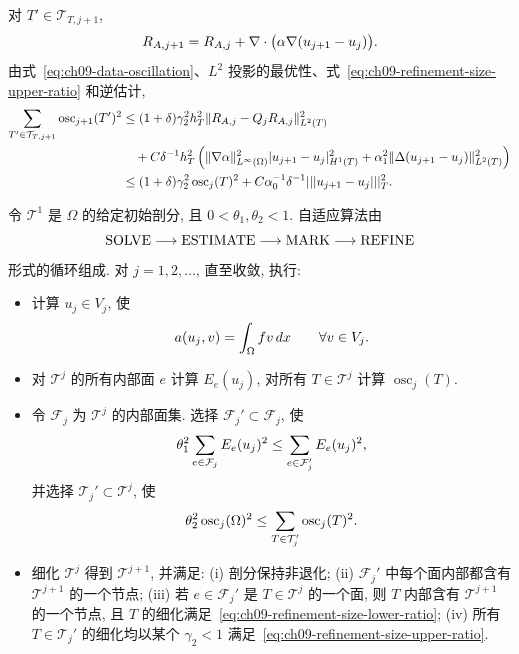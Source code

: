 \begin{Proof}
对 $T'\in\mathcal T_{T,j+1}$,
\[
\MathBookFormulaID{formula-ch09-consecutive-element-residuals}
R_{A,j+1}=R_{A,j}+\nabla\cdot\bigl(\alpha\nabla(u_{j+1}-u_j)\bigr).
\]
由式~\eqref{eq:ch09-data-oscillation}、$L^2$ 投影的最优性、式~\eqref{eq:ch09-refinement-size-upper-ratio} 和逆估计,
\begin{align*}
\MathBookFormulaID{formula-ch09-oscillation-reduction-proof}
\sum_{T'\in\mathcal T_{T,j+1}}\operatorname{osc}_{j+1}(T')^2
&\leq(1+\delta)\gamma_2^2h_T^2\|R_{A,j}-Q_jR_{A,j}\|_{L^2(T)}^2\\
&\quad+C\delta^{-1}h_T^2\left(
\|\nabla\alpha\|_{L^\infty(\Omega)}^2|u_{j+1}-u_j|_{H^1(T)}^2
+\alpha_1^2\|\Delta(u_{j+1}-u_j)\|_{L^2(T)}^2\right)\\
&\leq(1+\delta)\gamma_2^2\operatorname{osc}_j(T)^2
+C\alpha_0^{-1}\delta^{-1}|||u_{j+1}-u_j|||_T^2.
\end{align*}
\end{Proof}

令 $\mathcal T^1$ 是 $\Omega$ 的给定初始剖分, 且 $0<\theta_1,\theta_2<1$. 自适应算法由
\[
\MathBookFormulaID{formula-ch09-adaptive-loop}
\mathrm{SOLVE}\longrightarrow\mathrm{ESTIMATE}\longrightarrow
\mathrm{MARK}\longrightarrow\mathrm{REFINE}
\]
形式的循环组成. 对 $j=1,2,\ldots$, 直至收敛, 执行:

\begin{itemize}
\item 计算 $u_j\in V_j$, 使
\[
\MathBookFormulaID{formula-ch09-adaptive-solve-step}
a(u_j,v)=\int_\Omega fv\,dx
\qquad\forall v\in V_j.
\]
\item 对 $\mathcal T^j$ 的所有内部面 $e$ 计算 $E_e(u_j)$, 对所有 $T\in\mathcal T^j$ 计算 $\operatorname{osc}_j(T)$.
\item 令 $\mathcal F_j$ 为 $\mathcal T^j$ 的内部面集. 选择 $\mathcal F_j'\subset\mathcal F_j$, 使
\begin{equation}
\MathBookFormulaID{formula-ch09-estimator-marking}
\label{eq:ch09-estimator-marking}
\theta_1^2\sum_{e\in\mathcal F_j}E_e(u_j)^2
\leq\sum_{e\in\mathcal F_j'}E_e(u_j)^2,
\end{equation}
并选择 $\mathcal T_j'\subset\mathcal T^j$, 使
\begin{equation}
\MathBookFormulaID{formula-ch09-oscillation-marking}
\label{eq:ch09-oscillation-marking}
\theta_2^2\operatorname{osc}_j(\Omega)^2
\leq\sum_{T\in\mathcal T_j'}\operatorname{osc}_j(T)^2.
\end{equation}
\item 细化 $\mathcal T^j$ 得到 $\mathcal T^{j+1}$, 并满足: (i) 剖分保持非退化; (ii) $\mathcal F_j'$ 中每个面内部都含有 $\mathcal T^{j+1}$ 的一个节点; (iii) 若 $e\in\mathcal F_j'$ 是 $T\in\mathcal T^j$ 的一个面, 则 $T$ 内部含有 $\mathcal T^{j+1}$ 的一个节点, 且 $T$ 的细化满足~\eqref{eq:ch09-refinement-size-lower-ratio}; (iv) 所有 $T\in\mathcal T_j'$ 的细化均以某个 $\gamma_2<1$ 满足~\eqref{eq:ch09-refinement-size-upper-ratio}.
\end{itemize}

